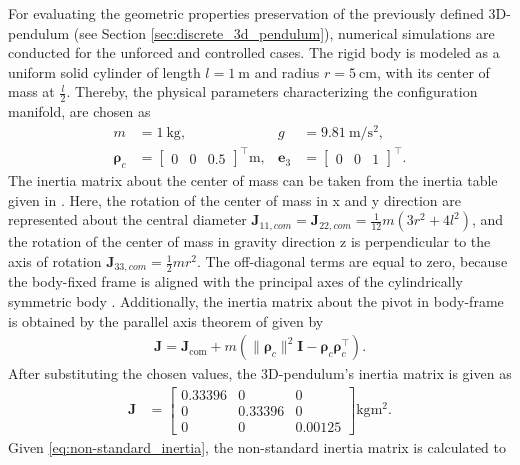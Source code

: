 For evaluating the geometric properties preservation of the previously defined 3D-pendulum (see Section \ref{sec:discrete_3d_pendulum}), numerical simulations are conducted for the unforced and controlled cases. The rigid body is modeled as a uniform solid cylinder of length $l=\SI{1}{\meter}$ and radius $r=\SI{5}{\cm}$, with its center of mass at $\frac{l}{2}$. Thereby, the physical parameters characterizing the configuration manifold, are chosen as 
\begin{align}
    m &= \SI{1}{\kilogram}, &
    g &= \SI{9.81}{\meter\per\second\squared}, \\
    \bm{\rho}_c &=
    \begin{bmatrix}
        0 & 0 & 0.5
    \end{bmatrix}^\top \si{\meter}, &
    \bm{e}_3 &=
    \begin{bmatrix}
        0 & 0 & 1
    \end{bmatrix}^\top.
\end{align}
 The inertia matrix about the center of mass can be taken from the inertia table given in \cite{RITInertiaTable216}. Here, the rotation of the center of mass in x and y direction are represented about the central diameter $\bm{J}_{11,com}=\bm{J}_{22,com}= \frac{1}{12}m(3r^2 + 4l^2)$, and the rotation of the center of mass in gravity direction z is perpendicular to the axis of rotation $\bm{J}_{33,com}=\frac{1}{2} mr^2$. The off-diagonal terms are equal to zero, because the body-fixed frame is aligned with the principal axes of the cylindrically symmetric body \cite{Lee2008}. Additionally, the inertia matrix about the pivot in body-frame is obtained by the parallel axis theorem of \cite{Benacquista2018ClassicalMechanics} given by
\begin{align}
    \bm{J}
    =
    \bm{J}_{\mathrm{com}}
    +
    m\left(
        \|\bm{\rho}_c\|^2\bm{I}
        -
        \bm{\rho}_c\bm{\rho}_c^{\top}
    \right).
\end{align}
After substituting the chosen values, the 3D-pendulum's inertia matrix is given as
\begin{align}
    \bm{J}
    &=
    \begin{bmatrix}
        0.33396 & 0 & 0 \\
        0 & 0.33396 & 0 \\
        0 & 0 & 0.00125
    \end{bmatrix}
    \si{\kilogram\meter\squared}.
\end{align}
Given \eqref{eq:non-standard_inertia}, the non-standard inertia matrix is calculated to
